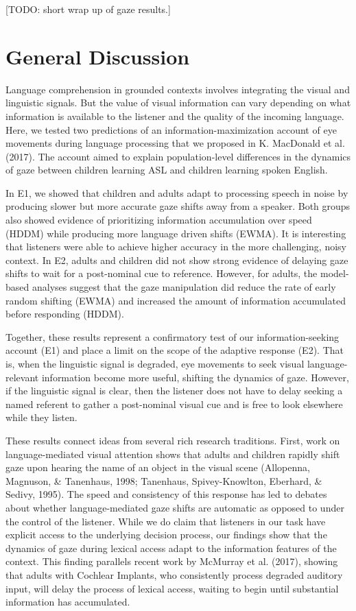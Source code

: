 \documentclass[10pt, letterpaper]{article}
\begin{document}
{[}TODO: short wrap up of gaze results.{]}

\section{General Discussion}\label{general-discussion}

Language comprehension in grounded contexts involves integrating the
visual and linguistic signals. But the value of visual information can
vary depending on what information is available to the listener and the
quality of the incoming language. Here, we tested two predictions of an
information-maximization account of eye movements during language
processing that we proposed in K. MacDonald et al. (2017). The account
aimed to explain population-level differences in the dynamics of gaze
between children learning ASL and children learning spoken English.

In E1, we showed that children and adults adapt to processing speech in
noise by producing slower but more accurate gaze shifts away from a
speaker. Both groups also showed evidence of prioritizing information
accumulation over speed (HDDM) while producing more language driven
shifts (EWMA). It is interesting that listeners were able to achieve
higher accuracy in the more challenging, noisy context. In E2, adults
and children did not show strong evidence of delaying gaze shifts to
wait for a post-nominal cue to reference. However, for adults, the
model-based analyses suggest that the gaze manipulation did reduce the
rate of early random shifting (EWMA) and increased the amount of
information accumulated before responding (HDDM).

Together, these results represent a confirmatory test of our
information-seeking account (E1) and place a limit on the scope of the
adaptive response (E2). That is, when the linguistic signal is degraded,
eye movements to seek visual language-relevant information become more
useful, shifting the dynamics of gaze. However, if the linguistic signal
is clear, then the listener does not have to delay seeking a named
referent to gather a post-nominal visual cue and is free to look
elsewhere while they listen.

These results connect ideas from several rich research traditions.
First, work on language-mediated visual attention shows that adults and
children rapidly shift gaze upon hearing the name of an object in the
visual scene (Allopenna, Magnuson, \& Tanenhaus, 1998; Tanenhaus,
Spivey-Knowlton, Eberhard, \& Sedivy, 1995). The speed and consistency
of this response has led to debates about whether language-mediated gaze
shifts are automatic as opposed to under the control of the listener.
While we do claim that listeners in our task have explicit access to the
underlying decision process, our findings show that the dynamics of gaze
during lexical access adapt to the information features of the context.
This finding parallels recent work by McMurray et al. (2017), showing
that adults with Cochlear Implants, who consistently process degraded
auditory input, will delay the process of lexical access, waiting to
begin until substantial information has accumulated.
\end{document}
